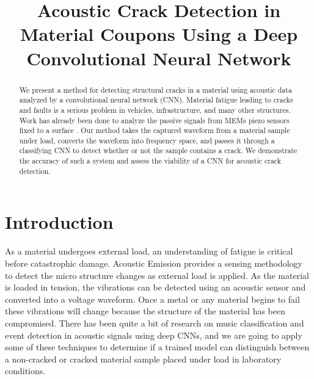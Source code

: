 \documentclass[conference]{IEEEtran}
\begin{document}
\title{Acoustic Crack Detection in Material Coupons Using a Deep Convolutional Neural Network
}

\author{
\and
{}
\and
{}
\and
}

\maketitle

\begin{abstract}
We present a method for detecting structural cracks in a material using acoustic data analyzed by a convolutional neural network (CNN). Material fatigue leading to cracks and faults is a serious problem in vehicles, infrastructure, and many other structures. Work has already been done to analyze the passive signals from MEMs piezo sensors fixed to a surface \cite{b1}. Our method takes the captured waveform from a material sample under load, converts the waveform into frequency space, and passes it through a classifying CNN to detect whether or not the sample contains a crack. We demonstrate the accuracy of such a system and assess the viability of a CNN for acoustic crack detection.
\end{abstract}

\section{Introduction}

As a material undergoes external load, an understanding of fatigue is critical before catastrophic damage. Acoustic Emission provides a sensing methodology to detect the micro structure changes as external load is applied. As the material is loaded in tension, the vibrations can be detected using an acoustic sensor and converted into a voltage waveform. Once a metal or any material begins to fail these vibrations will change because the structure of the material has been compromised. There has been quite a bit of research on music classification \cite{b2} and event detection \cite{b3} in acoustic signals using deep CNNs, and we are going to apply some of these techniques to determine if a trained model can distinguish between a non-cracked or cracked material sample placed under load in laboratory conditions.
\end{document}
